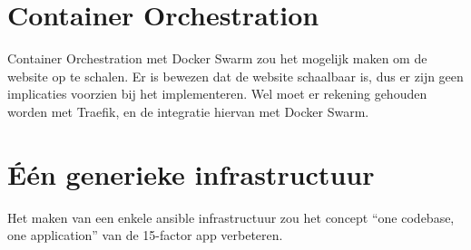 \section{Container Orchestration}
Container Orchestration met Docker Swarm zou het mogelijk maken om de website op te schalen. Er is bewezen dat de website schaalbaar is, dus er zijn geen implicaties voorzien bij het implementeren. Wel moet er rekening gehouden worden met Traefik, en de integratie hiervan met Docker Swarm.

\section{Één generieke infrastructuur}
Het maken van een enkele ansible infrastructuur zou het concept \enquote{one codebase, one application} van de 15-factor app verbeteren.